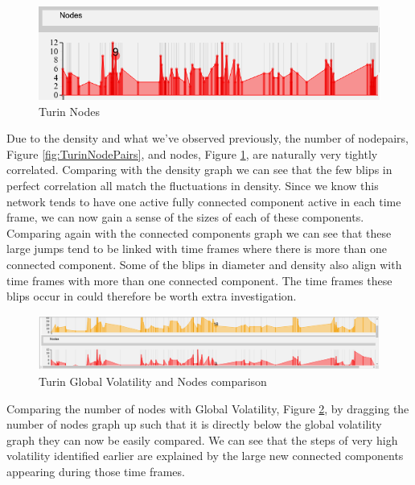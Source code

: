 \begin{figure}[h!]
  \begin{center}
  \includegraphics[trim={0 0 0 0}, width=140mm]{./Figures/TurinNodes.png}
  \caption{Turin Nodes}
  \label{fig:TurinNodes}
  \end{center}
\end{figure}
Due to the density and what we've observed previously, the number of nodepairs, Figure \ref{fig:TurinNodePairs}, and nodes, Figure \ref{fig:TurinNodes}, are naturally very tightly correlated. Comparing with the density graph we can see that the few blips in perfect correlation all match the fluctuations in density. Since we know this network tends to have one active fully connected component active in each time frame, we can now gain a sense of the sizes of each of these components. Comparing again with the connected components graph we can see that these large jumps tend to be linked with time frames where there is more than one connected component. Some of the blips in diameter and density also align with time frames with more than one connected component. The time frames these blips occur in could therefore be worth extra investigation.
    
\begin{figure}[h!]
  \begin{center}
  \includegraphics[trim={0 0 0 0}, width=140mm]{./Figures/TurinGlobalVolatilityAndNodes.png}
  \caption{Turin Global Volatility and Nodes comparison}
  \label{fig:TurinGlobalVolatilityAndNodes}
  \end{center}
\end{figure}

Comparing the number of nodes with Global Volatility, Figure \ref{fig:TurinGlobalVolatilityAndNodes}, by dragging the number of nodes graph up such that it is directly below the global volatility graph they can now be easily compared. We can see that the steps of very high volatility identified earlier are explained by the large new connected components appearing during those time frames.
   

